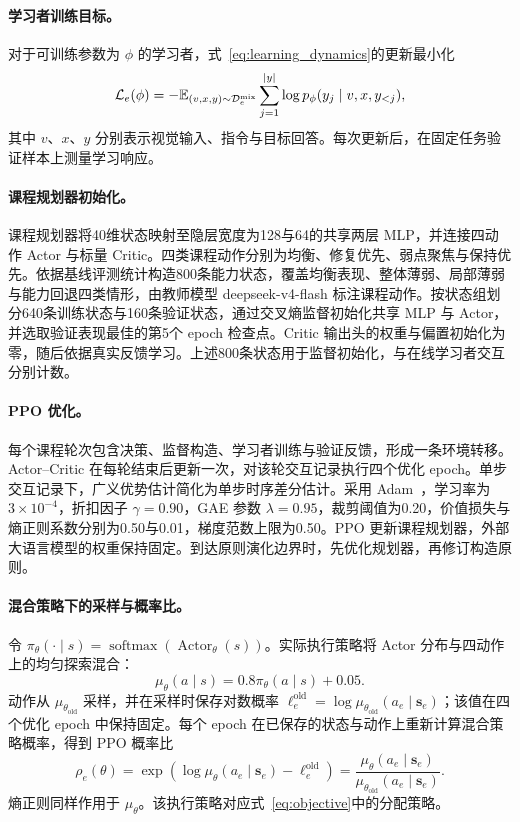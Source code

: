 \paragraph{学习者训练目标。}
\label{app:learner_objective}
对于可训练参数为 $\phi$ 的学习者，式~\ref{eq:learning_dynamics}的更新最小化
\begin{equation}
\mathcal L_e(\phi)=-\mathbb E_{(v,x,y)\sim\mathcal D_e^{\mathrm{mix}}}
\sum_{j=1}^{|y|}\log p_\phi(y_j\mid v,x,y_{<j}),
\label{eq:student}
\end{equation}
其中 $v$、$x$、$y$ 分别表示视觉输入、指令与目标回答。每次更新后，在固定任务验证样本上测量学习响应。

\paragraph{课程规划器初始化。}
课程规划器将40维状态映射至隐层宽度为128与64的共享两层 MLP，并连接四动作 Actor 与标量 Critic。四类课程动作分别为均衡、修复优先、弱点聚焦与保持优先。依据基线评测统计构造800条能力状态，覆盖均衡表现、整体薄弱、局部薄弱与能力回退四类情形，由教师模型 deepseek-v4-flash 标注课程动作。按状态组划分640条训练状态与160条验证状态，通过交叉熵监督初始化共享 MLP 与 Actor，并选取验证表现最佳的第5个 epoch 检查点。Critic 输出头的权重与偏置初始化为零，随后依据真实反馈学习。上述800条状态用于监督初始化，与在线学习者交互分别计数。

\paragraph{PPO 优化。}
每个课程轮次包含决策、监督构造、学习者训练与验证反馈，形成一条环境转移。Actor--Critic 在每轮结束后更新一次，对该轮交互记录执行四个优化 epoch。单步交互记录下，广义优势估计简化为单步时序差分估计。采用 Adam~\citep{kingma2015adam}，学习率为 $3\times10^{-4}$，折扣因子 $\gamma=0.90$，GAE 参数 $\lambda=0.95$，裁剪阈值为0.20，价值损失与熵正则系数分别为0.50与0.01，梯度范数上限为0.50。PPO 更新课程规划器，外部大语言模型的权重保持固定。到达原则演化边界时，先优化规划器，再修订构造原则。

\paragraph{混合策略下的采样与概率比。}
令 $\pi_\theta(\cdot\mid s)=\operatorname{softmax}(\operatorname{Actor}_\theta(s))$。实际执行策略将 Actor 分布与四动作上的均匀探索混合：
\[
\mu_\theta(a\mid s)=0.8\pi_\theta(a\mid s)+0.05.
\]
动作从 $\mu_{\theta_{\mathrm{old}}}$ 采样，并在采样时保存对数概率 $\ell_e^{\mathrm{old}}=\log\mu_{\theta_{\mathrm{old}}}(a_e\mid \mathbf{s}_e)$；该值在四个优化 epoch 中保持固定。每个 epoch 在已保存的状态与动作上重新计算混合策略概率，得到 PPO 概率比
\[
\rho_e(\theta)=\exp\!\left(\log\mu_\theta(a_e\mid \mathbf{s}_e)-\ell_e^{\mathrm{old}}\right)
=\frac{\mu_\theta(a_e\mid \mathbf{s}_e)}{\mu_{\theta_{\mathrm{old}}}(a_e\mid \mathbf{s}_e)}.
\]
熵正则同样作用于 $\mu_\theta$。该执行策略对应式~\ref{eq:objective}中的分配策略。

